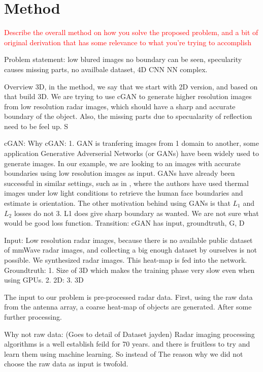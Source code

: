\section{ Method}
\textcolor{red}{
Describe the overall method on how you solve the proposed problem, and a bit of original derivation that has some relevance to what you’re trying to accomplish
}

Problem statement: low blured images no boundary can be seen, specularity causes missing parts, no availbale dataset, 4D CNN NN complex.

Overview 3D, in the method, we say that we start with 2D version, and based on that build 3D. 
We are trying to use cGAN to generate higher resolution images from low resolution radar images, which should have a sharp and accurate boundary of the object. Also, the missing parts due to specualarity of reflection need to be feel up.  S

cGAN:
	Why cGAN:
	1. GAN is tranfering images from 1 domain to another, some application 
	Generative Adverserial Networks (or GANs) have been widely used to generate images. In our example, we are looking to an images with accurate boundaries using low resolution images as input. GANs have already been successful in similar settings, such as in \cite{rf3dpose}, where the authors have used thermal images under low light conditions to retrieve the human face boundaries and estimate is orientation. The other motivation behind using GANs is that $L_1$ and $L_2$ losses do not 
	3. L1 does give sharp boundary as wanted. We are not sure what would be good loss function.
	Transition: cGAN has input, groundtruth, G, D
	
	Input: Low resolution radar images, because there is no available public dataset of mmWave radar images, and collecting a big enough dataset by ourselves is not possible. We synthesized radar images. This heat-map is fed into the network. 
	Groundtruth: 
	1. Size of 3D 	which makes the training phase very slow even when using GPUs. 
	2. 2D:
	3. 3D


The input to our problem is pre-processed radar data. First, using the raw data from the antenna array, a coarse heat-map of objects are generated. After some further processing. 

Why not raw data: (Goes to detail of Dataset jayden)
Radar imaging processing algorithms is a well establish feild for 70 years. and there is fruitless to try and learn them using machine learning.
So instead of  The reason why we did not choose the raw data as input is twofold. 